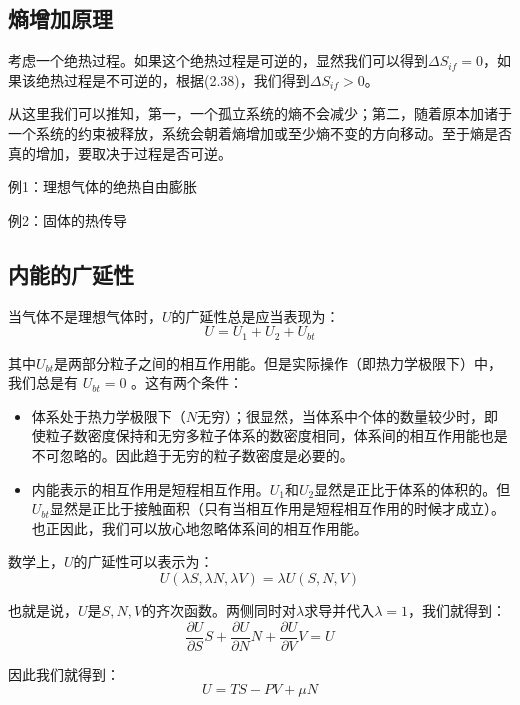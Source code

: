 \documentclass[a4paper, 10pt, openany]{book}%
\begin{document}
\subsection{熵增加原理}
考虑一个绝热过程。如果这个绝热过程是可逆的，显然我们可以得到$\Delta S_{if}=0$，如果该绝热过程是不可逆的，根据(2.38)，我们得到$\Delta S_{if}>0$。

从这里我们可以推知，第一，一个孤立系统的熵不会减少；第二，随着原本加诸于一个系统的约束被释放，系统会朝着熵增加或至少熵不变的方向移动。至于熵是否真的增加，要取决于过程是否可逆。

\noindent 例1：理想气体的绝热自由膨胀

\noindent 例2：固体的热传导

\subsection{内能的广延性}
当气体不是理想气体时，$U$的广延性总是应当表现为：
\begin{equation}
U=U_1+U_2+U_{bt}
\end{equation}

其中$U_{bt}$是两部分粒子之间的相互作用能。但是实际操作（即热力学极限下）中，我们总是有 $U_{bt}=0$ 。这有两个条件：
 \begin{itemize}
  \item 体系处于热力学极限下（$N$无穷）；很显然，当体系中个体的数量较少时，即使粒子数密度保持和无穷多粒子体系的数密度相同，体系间的相互作用能也是不可忽略的。因此趋于无穷的粒子数密度是必要的。
\item 内能表示的相互作用是短程相互作用。$U_1$和$U_2$显然是正比于体系的体积的。但$U_{bt}$显然是正比于接触面积（只有当相互作用是短程相互作用的时候才成立）。也正因此，我们可以放心地忽略体系间的相互作用能。
 \end{itemize}

数学上，$U$的广延性可以表示为：
\begin{equation}
  U(\lambda S,\lambda N,\lambda V)=\lambda U(S,N,V)
\end{equation}

 也就是说，$U$是$S,N,V$的齐次函数。两侧同时对$\lambda$求导并代入$\lambda=1$，我们就得到：
 \begin{equation}
  \frac{\partial U}{\partial S}S+\frac{\partial U}{\partial N}N+\frac{\partial U}{\partial V}V=U
 \end{equation}

因此我们就得到：
\begin{equation}
  U=TS-PV+\mu N
\end{equation}
\end{document}
